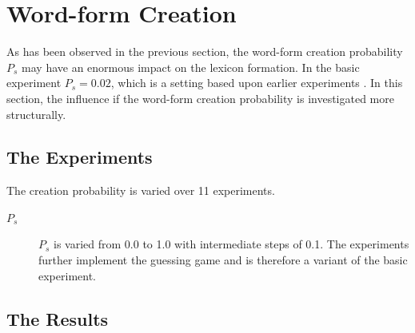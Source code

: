 
\section{Word-form Creation}\label{s:par:ps}

As has been observed in the previous section, the word-form creation probability $P_s$ may have an enormous impact on the lexicon formation. In the basic experiment $P_s=0.02$, which is a setting based upon earlier experiments \citep{vogt:1998b}. In this section, the influence if the word-form creation probability is investigated more structurally.

\subsection{The Experiments}

The creation probability is varied over 11 experiments.

\begin{description}
\item[$P_s$] $P_s$ is varied from 0.0 to 1.0 with intermediate steps of 0.1. The experiments further implement the guessing game and is therefore a variant of the basic experiment.
\end{description}

\subsection{The Results}

